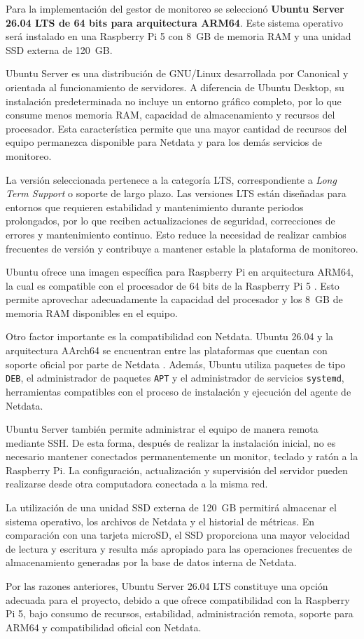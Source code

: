 
Para la implementación del gestor de monitoreo se seleccionó
\textbf{Ubuntu Server 26.04 LTS de 64 bits para arquitectura ARM64}.
Este sistema operativo será instalado en una Raspberry Pi 5 con 8~GB de
memoria RAM y una unidad SSD externa de 120~GB.

Ubuntu Server es una distribución de GNU/Linux desarrollada por Canonical y
orientada al funcionamiento de servidores. A diferencia de Ubuntu Desktop,
su instalación predeterminada no incluye un entorno gráfico completo, por
lo que consume menos memoria RAM, capacidad de almacenamiento y recursos del
procesador. Esta característica permite que una mayor cantidad de recursos
del equipo permanezca disponible para Netdata y para los demás servicios de
monitoreo.

La versión seleccionada pertenece a la categoría LTS, correspondiente a
\textit{Long Term Support} o soporte de largo plazo. Las versiones LTS están
diseñadas para entornos que requieren estabilidad y mantenimiento durante
periodos prolongados, por lo que reciben actualizaciones de seguridad,
correcciones de errores y mantenimiento continuo. Esto reduce la necesidad
de realizar cambios frecuentes de versión y contribuye a mantener estable
la plataforma de monitoreo. \cite{ubuntu-server}

Ubuntu ofrece una imagen específica para Raspberry Pi en arquitectura ARM64,
la cual es compatible con el procesador de 64 bits de la Raspberry Pi 5
\cite{ubuntu-raspberry}. Esto permite aprovechar adecuadamente la capacidad
del procesador y los 8~GB de memoria RAM disponibles en el equipo.

Otro factor importante es la compatibilidad con Netdata. Ubuntu 26.04 y la
arquitectura AArch64 se encuentran entre las plataformas que cuentan con
soporte oficial por parte de Netdata \cite{netdata-plataformas}. Además,
Ubuntu utiliza paquetes de tipo \texttt{DEB}, el administrador de paquetes
\texttt{APT} y el administrador de servicios \texttt{systemd}, herramientas
compatibles con el proceso de instalación y ejecución del agente de Netdata.

Ubuntu Server también permite administrar el equipo de manera remota mediante
SSH. De esta forma, después de realizar la instalación inicial, no es
necesario mantener conectados permanentemente un monitor, teclado y ratón a
la Raspberry Pi. La configuración, actualización y supervisión del servidor
pueden realizarse desde otra computadora conectada a la misma red.

La utilización de una unidad SSD externa de 120~GB permitirá almacenar el
sistema operativo, los archivos de Netdata y el historial de métricas. En
comparación con una tarjeta microSD, el SSD proporciona una mayor velocidad
de lectura y escritura y resulta más apropiado para las operaciones frecuentes
de almacenamiento generadas por la base de datos interna de Netdata.

Por las razones anteriores, Ubuntu Server 26.04 LTS constituye una opción
adecuada para el proyecto, debido a que ofrece compatibilidad con la
Raspberry Pi 5, bajo consumo de recursos, estabilidad, administración remota,
soporte para ARM64 y compatibilidad oficial con Netdata.